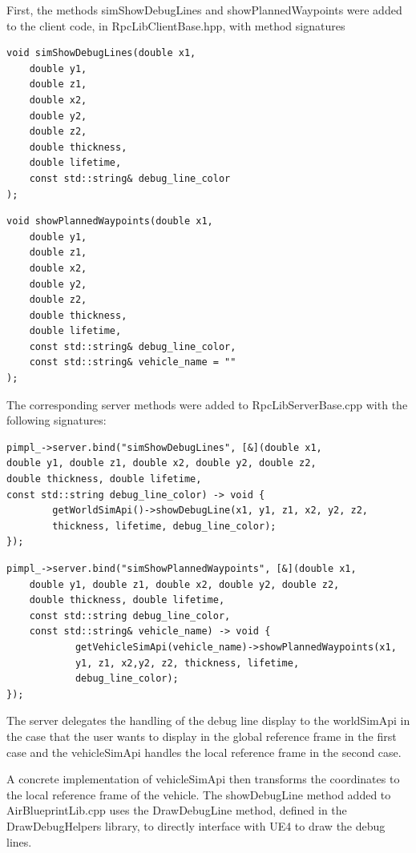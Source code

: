 First, the methods simShowDebugLines and showPlannedWaypoints were added to the client code, in RpcLibClientBase.hpp, with method signatures
\begin{verbatim}
void simShowDebugLines(double x1, 
    double y1,
    double z1,
    double x2,
    double y2,
    double z2,
    double thickness, 
    double lifetime,
    const std::string& debug_line_color
);
\end{verbatim}
\begin{verbatim}
void showPlannedWaypoints(double x1, 
    double y1, 
    double z1, 
    double x2, 
    double y2, 
    double z2, 
    double thickness, 
    double lifetime,
    const std::string& debug_line_color,
    const std::string& vehicle_name = ""
);
\end{verbatim}

The corresponding server methods were added to RpcLibServerBase.cpp with the following signatures:
\begin{verbatim}
pimpl_->server.bind("simShowDebugLines", [&](double x1,
double y1, double z1, double x2, double y2, double z2,
double thickness, double lifetime, 
const std::string debug_line_color) -> void {
        getWorldSimApi()->showDebugLine(x1, y1, z1, x2, y2, z2, 
        thickness, lifetime, debug_line_color);
});
\end{verbatim}
		

\begin{verbatim}
pimpl_->server.bind("simShowPlannedWaypoints", [&](double x1, 
    double y1, double z1, double x2, double y2, double z2, 
    double thickness, double lifetime, 
    const std::string debug_line_color,
    const std::string& vehicle_name) -> void {
            getVehicleSimApi(vehicle_name)->showPlannedWaypoints(x1, 
            y1, z1, x2,y2, z2, thickness, lifetime, 
            debug_line_color);
});
\end{verbatim}

The server delegates the handling of the debug line display to the worldSimApi in the case that the user wants to display in the global reference frame in the first case and the vehicleSimApi handles the local reference frame in the second case. 

A concrete implementation of vehicleSimApi then transforms the coordinates to the local reference frame of the vehicle. The showDebugLine method added to AirBlueprintLib.cpp uses the DrawDebugLine method, defined in the DrawDebugHelpers library, to directly interface with UE4 to draw the debug lines.

